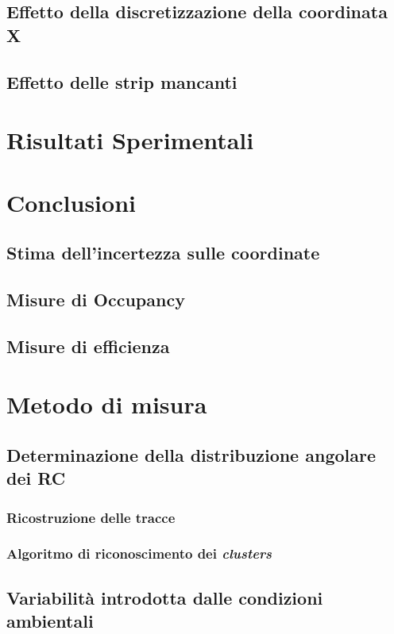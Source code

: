 \documentclass[8pt]{extarticle}
\begin{document}
\subsection{Effetto della discretizzazione della coordinata X}

\subsection{Effetto delle strip mancanti}




\section{Risultati Sperimentali}




\section{Conclusioni}
\subsection{Stima dell'incertezza sulle coordinate} \label{subsec:coord_err}
\subsection{Misure di Occupancy}
\subsection{Misure di efficienza}
\section{Metodo di misura}
\subsection{Determinazione della distribuzione angolare dei RC}
\subsubsection{Ricostruzione delle tracce}
\subsubsection{Algoritmo di riconoscimento dei \textit{clusters}}
\subsection{Variabilità introdotta dalle condizioni ambientali}
\end{document}
